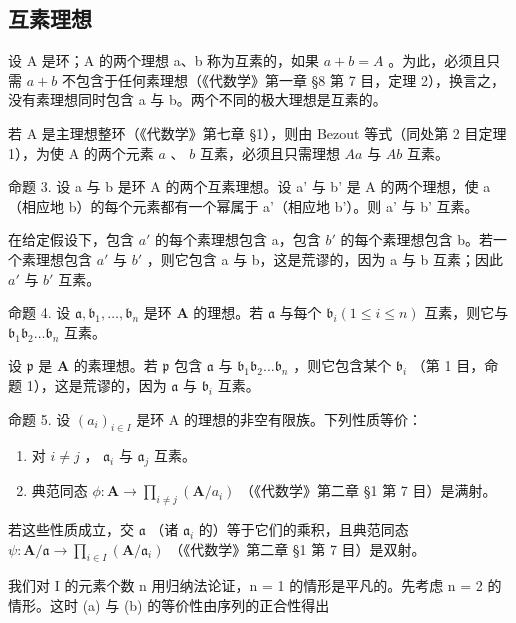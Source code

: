 \subsection{互素理想}

设 A 是环；A 的两个理想 a、b 称为互素的，如果 \(a + b = A\) 。为此，必须且只需 \(a + b\) 不包含于任何素理想（《代数学》第一章 §8 第 7 目，定理 2），换言之，没有素理想同时包含 a 与 b。两个不同的极大理想是互素的。

若 A 是主理想整环（《代数学》第七章 §1），则由 Bezout 等式（同处第 2 目定理 1），为使 A 的两个元素 \(a\) 、 \(b\) 互素，必须且只需理想 \(Aa\) 与 \(Ab\) 互素。

命题 3. 设 a 与 b 是环 A 的两个互素理想。设 a' 与 b' 是 A 的两个理想，使 a（相应地 b）的每个元素都有一个幂属于 a'（相应地 b'）。则 a' 与 b' 互素。

在给定假设下，包含 \(a'\) 的每个素理想包含 a，包含 \(b'\) 的每个素理想包含 b。若一个素理想包含 \(a'\) 与 \(b'\) ，则它包含 a 与 b，这是荒谬的，因为 a 与 b 互素；因此 \(a'\) 与 \(b'\) 互素。

命题 4. 设 \(\mathfrak{a}, \mathfrak{b}_1, \ldots, \mathfrak{b}_n\) 是环 \(\mathbf{A}\) 的理想。若 \(\mathfrak{a}\) 与每个 \(\mathfrak{b}_i (1 \leqslant i \leqslant n)\) 互素，则它与 \(\mathfrak{b}_1\mathfrak{b}_2 \ldots \mathfrak{b}_n\) 互素。

设 \(\mathfrak{p}\) 是 \(\mathbf{A}\) 的素理想。若 \(\mathfrak{p}\) 包含 \(\mathfrak{a}\) 与 \(\mathfrak{b}_1\mathfrak{b}_2\ldots \mathfrak{b}_n\) ，则它包含某个 \(\mathfrak{b}_i\) （第 1 目，命题 1），这是荒谬的，因为 \(\mathfrak{a}\) 与 \(\mathfrak{b}_i\) 互素。

命题 5. 设 \((a_{i})_{i\in I}\) 是环 A 的理想的非空有限族。下列性质等价：

\begin{enumerate}
\def\labelenumi{(\alph{enumi})}
\item
  对 \(i \neq j\) ， \(\mathfrak{a}_i\) 与 \(\mathfrak{a}_j\) 互素。
\item
  典范同态 \(\phi: \mathbf{A} \to \prod_{i \neq j} (\mathbf{A} / a_i)\) （《代数学》第二章 §1 第 7 目）是满射。
\end{enumerate}

若这些性质成立，交 \(\mathfrak{a}\) （诸 \(\mathfrak{a}_i\) 的）等于它们的乘积，且典范同态 \(\psi: \mathbf{A} / \mathfrak{a} \to \prod_{i \in I} (\mathbf{A} / \mathfrak{a}_i)\) （《代数学》第二章 §1 第 7 目）是双射。

我们对 I 的元素个数 n 用归纳法论证，n = 1 的情形是平凡的。先考虑 n = 2 的情形。这时 (a) 与 (b) 的等价性由序列的正合性得出

